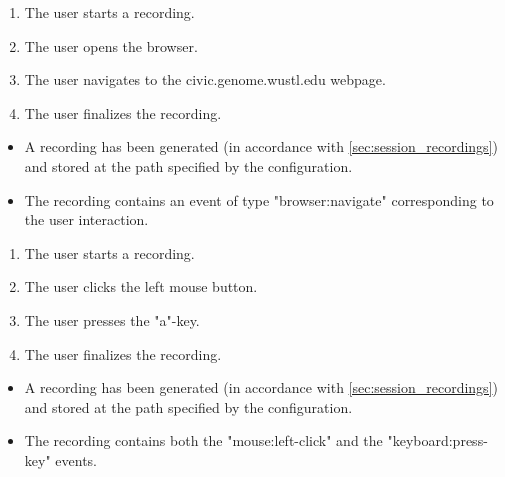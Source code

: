 \begin{tests}
    {\begin{enumerate}
        \item The \gls{user} starts a recording.
        \item The \gls{user} opens the \gls{browser}.
        \item The \gls{user} navigates to the civic.genome.wustl.edu webpage.
        \item The \gls{user} finalizes the recording.
    \end{enumerate}}
    {\begin{itemize}
        \item A recording has been generated (in accordance with \ref{sec:session_recordings}) and stored at the path specified by the configuration.
        \item The recording contains an \gls{event} of type "browser:navigate" corresponding to the \gls{user} interaction.
    \end{itemize}}

    {\begin{enumerate}
        \item The \gls{user} starts a recording.
        \item The \gls{user} clicks the left mouse button.
        \item The \gls{user} presses the "a"-key.
        \item The \gls{user} finalizes the recording.
    \end{enumerate}}
    {\begin{itemize}
        \item A recording has been generated (in accordance with \ref{sec:session_recordings}) and stored at the path specified by the configuration.
        \item The recording contains both the "mouse:left-click" and the "keyboard:press-key" events.
    \end{itemize}}


\end{tests}
